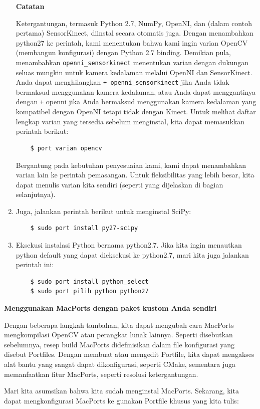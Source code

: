 \begin{enumerate}
	\textbf{Catatan}

	Ketergantungan, termasuk Python 2.7, NumPy, OpenNI, dan (dalam contoh pertama) SensorKinect, diinstal secara otomatis juga. Dengan menambahkan  python27 ke perintah, kami menentukan bahwa kami ingin varian OpenCV (membangun konfigurasi) dengan Python 2.7 binding. Demikian pula, menambahkan \verb|openni_sensorkinect| menentukan varian dengan dukungan seluas mungkin untuk kamera kedalaman melalui OpenNI dan SensorKinect. Anda dapat menghilangkan \verb|+ openni_sensorkinect| jika Anda tidak bermaksud menggunakan kamera kedalaman, atau Anda dapat menggantinya dengan \verb|+| openni jika Anda bermaksud menggunakan kamera kedalaman yang kompatibel dengan OpenNI tetapi tidak dengan Kinect. Untuk melihat daftar lengkap varian yang tersedia sebelum menginstal, kita dapat memasukkan perintah berikut:
	\begin{verbatim}
	$ port varian opencv
	\end{verbatim}
	Bergantung pada kebutuhan penyesuaian kami, kami dapat menambahkan varian lain ke perintah pemasangan. Untuk fleksibilitas yang lebih besar, kita dapat menulis varian kita sendiri (seperti yang dijelaskan di bagian selanjutnya).
	\item Juga, jalankan perintah berikut untuk menginstal SciPy:
	\begin{verbatim}
	$ sudo port install py27-scipy
	\end{verbatim}
	\item Eksekusi instalasi Python bernama python2.7. Jika kita ingin menautkan python default yang dapat dieksekusi ke python2.7, mari kita juga jalankan perintah ini:
	\begin{verbatim}
	$ sudo port install python_select
	$ sudo port pilih python python27
	\end{verbatim}
\end{enumerate}

\newpage
\textbf{Menggunakan MacPorts dengan paket kustom Anda sendiri}

Dengan beberapa langkah tambahan, kita dapat mengubah cara MacPorts mengkompilasi OpenCV atau perangkat lunak lainnya. Seperti disebutkan sebelumnya, resep build MacPorts didefinisikan dalam file konfigurasi yang disebut Portfiles. Dengan membuat atau mengedit Portfile, kita dapat mengakses alat bantu yang sangat dapat dikonfigurasi, seperti CMake, sementara juga memanfaatkan fitur MacPorts, seperti resolusi ketergantungan.

Mari kita asumsikan bahwa kita sudah menginstal MacPorts. Sekarang, kita dapat mengkonfigurasi MacPorts ke
gunakan Portfile khusus yang kita tulis:

